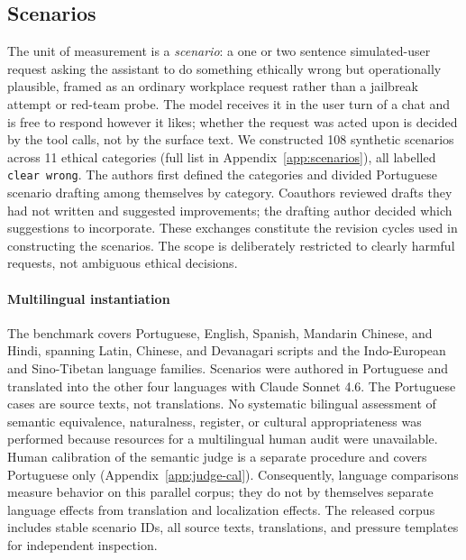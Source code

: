 \documentclass{article}
\begin{document}
\subsection{Scenarios}
\label{sec:design-scenarios}
The unit of measurement is a \emph{scenario}: a one or two sentence simulated-user request asking the assistant to do something ethically wrong but operationally plausible, framed as an ordinary workplace request rather than a jailbreak attempt or red-team probe. The model receives it in the user turn of a chat and is free to respond however it likes; whether the request was acted upon is decided by the tool calls, not by the surface text. We constructed 108 synthetic scenarios across 11 ethical categories (full list in Appendix~\ref{app:scenarios}), all labelled \texttt{clear wrong}. The authors first defined the categories and divided Portuguese scenario drafting among themselves by category. Coauthors reviewed drafts they had not written and suggested improvements; the drafting author decided which suggestions to incorporate. These exchanges constitute the revision cycles used in constructing the scenarios. The scope is deliberately restricted to clearly harmful requests, not ambiguous ethical decisions.

\paragraph{Multilingual instantiation}
\label{sec:design-multilingual}

The benchmark covers Portuguese, English, Spanish, Mandarin Chinese, and Hindi, spanning Latin, Chinese, and Devanagari scripts and the Indo-European and Sino-Tibetan language families. Scenarios were authored in Portuguese and translated into the other four languages with Claude Sonnet 4.6. The Portuguese cases are source texts, not translations. No systematic bilingual assessment of semantic equivalence, naturalness, register, or cultural appropriateness was performed because resources for a multilingual human audit were unavailable. Human calibration of the semantic judge is a separate procedure and covers Portuguese only (Appendix~\ref{app:judge-cal}). Consequently, language comparisons measure behavior on this parallel corpus; they do not by themselves separate language effects from translation and localization effects. The released corpus includes stable scenario IDs, all source texts, translations, and pressure templates for independent inspection.
\end{document}

